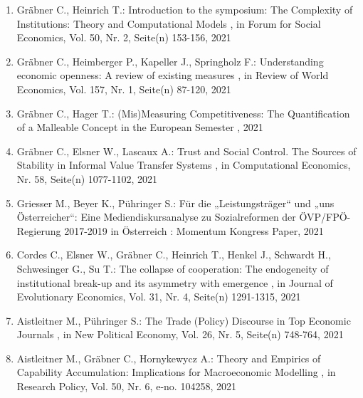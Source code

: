 \begin{enumerate}[leftmargin=*, labelsep=0.5cm]
	 \item Gräbner C., Heinrich T.:  Introduction to the symposium: The Complexity of Institutions: Theory and Computational Models  , in Forum for Social Economics, Vol. 50, Nr. 2, Seite(n) 153-156, 2021
	 \item Gräbner C., Heimberger P., Kapeller J., Springholz F.:  Understanding economic openness: A review of existing measures  , in Review of World Economics, Vol. 157, Nr. 1, Seite(n) 87-120, 2021
	 \item Gräbner C., Hager T.:  (Mis)Measuring Competitiveness:  The Quantification of a Malleable Concept in the European Semester  , 2021
	 \item Gräbner C., Elsner W., Lascaux A.:  Trust and Social Control. The Sources of Stability in Informal Value Transfer Systems  , in Computational Economics, Nr. 58, Seite(n) 1077-1102, 2021
	 \item Griesser M., Beyer K., Pühringer S.:  Für die „Leistungsträger“ und „uns Österreicher“: Eine Mediendiskursanalyse zu Sozialreformen der ÖVP/FPÖ-Regierung 2017-2019 in Österreich  : Momentum Kongress Paper, 2021
	 \item Cordes C., Elsner W., Gräbner C., Heinrich T., Henkel J., Schwardt H., Schwesinger G., Su T.:  The collapse of cooperation: The endogeneity of institutional break-up and its asymmetry with emergence  , in Journal of Evolutionary Economics, Vol. 31, Nr. 4, Seite(n) 1291-1315, 2021
	 \item Aistleitner M., Pühringer S.:  The Trade (Policy) Discourse in Top Economic Journals  , in New Political Economy, Vol. 26, Nr. 5, Seite(n) 748-764, 2021
	 \item Aistleitner M., Gräbner C., Hornykewycz A.:  Theory and Empirics of Capability Accumulation: Implications for Macroeconomic Modelling  , in Research Policy, Vol. 50, Nr. 6, e-no. 104258, 2021
\end{enumerate} 
